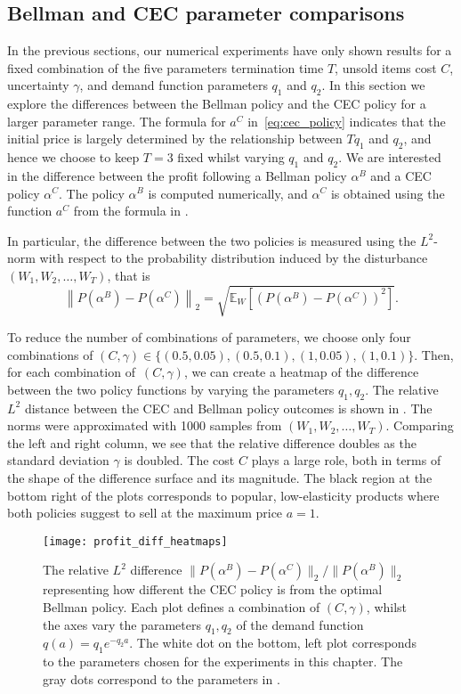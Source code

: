 \documentclass[main.tex]{subfiles}
\begin{document}
\subsection{Bellman and CEC parameter comparisons}\label{sec:parameter_comparison}
In the previous sections, our numerical experiments have only shown
results for a fixed combination of the five parameters
termination time $T$, unsold items cost $C$, uncertainty $\gamma$, and
demand function parameters $q_1$ and $q_2$.
In this section we explore the differences between the Bellman policy
and the CEC policy for a larger parameter range.
The formula for $a^C$ in~\eqref{eq:cec_policy} indicates that the
initial price is largely determined by the relationship between
$Tq_1$ and $q_2$, and hence we choose to keep $T=3$ fixed whilst
varying $q_1$ and $q_2$.
We are interested in the difference between the profit following
a Bellman policy $\alpha^B$ and a CEC policy $\alpha^C$.
The policy $\alpha^B$ is computed numerically, and
$\alpha^C$ is obtained using the function $a^C$ from
the formula in .

In particular, the difference between the two policies is measured
using the $L^2$-norm with respect to the probability distribution
induced by the disturbance $(W_1,W_2,\dots,W_T)$, that is
\begin{equation}
  \left\|P(\alpha^B)-P(\alpha^C)\right\|_2
  =\sqrt{\mathbb{E}_W\left[{( P(\alpha^B)-P(\alpha^C) )}^2 \right]}.
\end{equation}

To reduce the number of combinations of parameters, we choose only
four combinations of
$(C,\gamma)\in\{(0.5,0.05),(0.5,0.1),(1,0.05),(1,0.1)\}$.
Then,
for each combination of\, $(C,\gamma)$,
we can create a heatmap of the difference between the two policy
functions by varying the parameters $q_1,q_2$.
The relative $L^2$ distance between the CEC and Bellman policy outcomes
is shown in . The norms were approximated
with \num{1000} samples from $(W_1,W_2,\dots,W_T)$.
Comparing the left and right column, we see that the relative difference doubles as
the standard deviation $\gamma$ is doubled. The cost $C$ plays a large
role, both in terms of the shape of the difference surface and its
magnitude.
The black region at the bottom right of the plots corresponds to popular,
low-elasticity products where both policies suggest to sell at the
maximum price $a=1$.
\begin{figure}[htbp]
  \texttt{[image: profit\_diff\_heatmaps]}
  \caption{The relative $L^2$ difference
    $\|P(\alpha^B)-P(\alpha^C)\|_2/\|P(\alpha^B)\|_2$ representing
    how different the CEC policy is from the optimal Bellman policy.
    Each plot defines a combination of $(C,\gamma)$, whilst
    the axes vary the parameters $q_1,q_2$ of the demand function
    $q(a)=q_1e^{-q_2a}$.
    The white dot on the bottom, left plot corresponds to the
    parameters chosen for the experiments in this chapter. The gray
    dots correspond to the parameters in .
  }\label{fig:profit_diff_heatmaps}
\end{figure}
\end{document}
